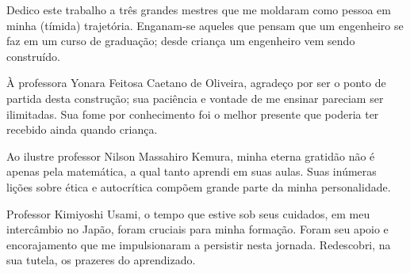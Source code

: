 Dedico este trabalho a três grandes mestres que me moldaram como pessoa em 
minha (tímida) trajetória. Enganam-se aqueles que pensam que um engenheiro se faz em
um curso de graduação; 
desde criança um engenheiro vem sendo construído. 

À professora Yonara Feitosa Caetano de Oliveira, agradeço por ser 
o ponto de partida desta construção; 
sua paciência e vontade de me ensinar pareciam ser
ilimitadas. Sua fome por conhecimento foi o melhor presente que poderia 
ter recebido ainda quando criança. 

Ao ilustre professor Nilson Massahiro Kemura, minha eterna gratidão não é apenas pela matemática, 
a qual tanto  aprendi em suas aulas. Suas inúmeras lições sobre ética e autocrítica compõem
grande parte da minha personalidade.

Professor Kimiyoshi Usami, o tempo que estive sob seus cuidados, em meu intercâmbio no Japão,
foram cruciais para minha formação. Foram seu apoio e encorajamento que me impulsionaram a 
persistir nesta jornada. Redescobri, na sua tutela, os prazeres do aprendizado.